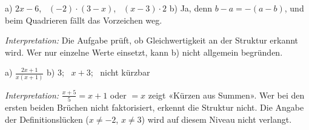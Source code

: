 \documentclass[11pt]{exam}
\newcommand{\aufgabe}[1]{%
  \needspace{8\baselineskip}%
  \renewcommand{\questionlabel}{\textbf{#1}}%
  \question}
\newcommand{\raum}[1]{\ifprintanswers\else\fillwithgrid{#1}\fi}
\newcommand{\diagnose}[1]{\par\smallskip\textit{Interpretation:} #1}
\begin{document}
\begin{questions}
\begin{solution}
  a) $2x - 6$, \ $(-2) \cdot (3 - x)$, \ $(x - 3) \cdot 2$ \qquad
  b) Ja, denn $b - a = -(a - b)$, und beim Quadrieren fällt das Vorzeichen weg.
  \diagnose{Die Aufgabe prüft, ob Gleichwertigkeit an der Struktur erkannt wird.
  Wer nur einzelne Werte einsetzt, kann b) nicht allgemein begründen.}
\end{solution}
\raum{3cm}

\aufgabe{3.6}
\begin{solution}
  a) $\frac{2x + 1}{x(x + 1)}$ \quad
  b) $3$; \ $x + 3$; \ nicht kürzbar
  \diagnose{$\frac{x + 5}{5} = x + 1$ oder $= x$ zeigt «Kürzen aus Summen». Wer
  bei den ersten beiden Brüchen nicht faktorisiert, erkennt die Struktur nicht.
  Die Angabe der Definitionslücken ($x \neq -2$, $x \neq 3$) wird auf diesem
  Niveau nicht verlangt.}
\end{solution}
\raum{3.5cm}

\aufgabe{4.6}
\end{questions}
\end{document}

